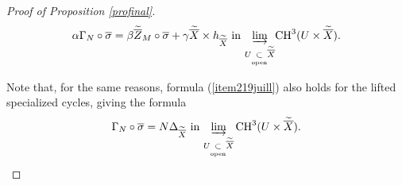\documentclass[10pt]{article}
\begin{document}
\begin{proof}[Proof of Proposition \ref{profinal}]
\begin{eqnarray}\label{eqcompacorrespdelatspec}  \alpha \Gamma_N\circ \overline{\sigma}= \beta \widetilde{\overline{Z}}_M\circ \overline{\sigma} +\gamma \widetilde{\overline{X}}\times h_{\widetilde{\overline{X}}}\,\,{\rm in}\,\,\underset{{U}\underset{{\rm open}}{\subset} \widetilde{\overline{X}}}{\underrightarrow{\rm lim}}{\rm CH}^3(U\times \widetilde{\overline{X}}).
\end{eqnarray}

Note that, for the same reasons,  formula (\ref{item219juill}) also  holds for the lifted specialized cycles, giving the formula
\begin{eqnarray}\label{tructruc1907}  \Gamma_N\circ \overline{\sigma}= N\Delta_{\widetilde{\overline{X}}}\,\,{\rm in}\,\, \underset{{U}\underset{{\rm open}}{\subset} \widetilde{\overline{X}}}{\underrightarrow{\rm lim}}\,{\rm CH}^3(U\times \widetilde{\overline{X}}).
\end{eqnarray}


\end{proof}
\end{document}
